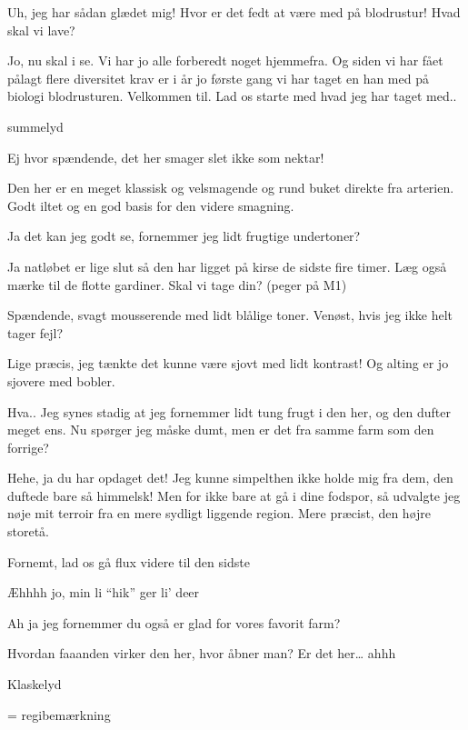 \documentclass[a4paper,11pt]{article}
\begin{document}
\begin{sketch}


 Uh, jeg har sådan glædet mig! Hvor er det fedt at være med på blodrustur! Hvad skal vi lave?

 Jo, nu skal i se. Vi har jo alle forberedt noget hjemmefra. Og siden vi har fået pålagt flere diversitet krav er i år jo første gang vi har taget en han med på biologi blodrusturen. Velkommen til. Lad os starte med hvad jeg har taget med..

 summelyd


 Ej hvor spændende, det her smager slet ikke som nektar!

 Den her er en meget klassisk og velsmagende og rund buket direkte fra arterien. Godt iltet og en god basis for den videre smagning.

 Ja det kan jeg godt se, fornemmer jeg lidt frugtige undertoner?

 Ja natløbet er lige slut så den har ligget på kirse de sidste fire timer. Læg også mærke til de flotte gardiner. Skal vi tage din? (peger på M1)


 Spændende, svagt mousserende med lidt blålige toner. Venøst, hvis jeg ikke helt tager fejl?

 Lige præcis, jeg tænkte det kunne være sjovt med lidt kontrast! Og alting er jo sjovere med bobler.

 Hva.. Jeg synes stadig at jeg fornemmer lidt tung frugt i den her, og den dufter meget ens. Nu spørger jeg måske dumt, men er det fra samme farm som den forrige?

 Hehe, ja du har opdaget det! Jeg kunne simpelthen ikke holde mig fra dem, den duftede bare så himmelsk! Men for ikke bare at gå i dine fodspor, så udvalgte jeg nøje mit terroir fra en mere sydligt liggende region. Mere præcist, den højre storetå.

 Fornemt, lad os gå flux videre til den sidste

 Æhhhh jo, min li “hik” ger li’ deer

  Ah ja jeg fornemmer du også er glad for vores favorit farm?


 Hvordan faaanden virker den her, hvor åbner man? Er det her… ahhh

 Klaskelyd

 = regibemærkning
\end{sketch}
\end{document}
